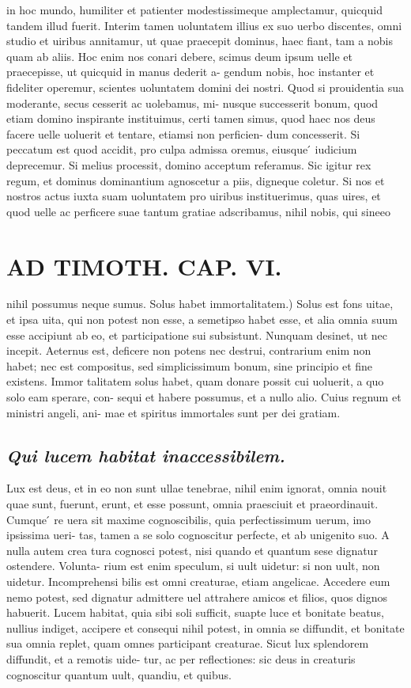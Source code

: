 \documentclass{article}
\begin{document}
\begin{pages}
in hoc mundo, humiliter et patienter modestissimeque amplectamur, quicquid tandem illud fuerit. Interim tamen uoluntatem illius ex suo uerbo discentes, omni studio et uiribus annitamur, ut quae praecepit dominus, haec fiant, tam a nobis quam ab aliis. Hoc enim nos conari debere, scimus deum ipsum uelle et praecepisse, ut quicquid in manus dederit a- gendum nobis, hoc instanter et fideliter operemur, scientes uoluntatem domini dei nostri. Quod si prouidentia sua moderante, secus cesserit ac uolebamus, mi- nusque successerit bonum, quod etiam domino inspirante instituimus, certi tamen simus, quod haec nos deus facere uelle uoluerit et tentare, etiamsi non perficien- dum concesserit. Si peccatum est quod accidit, pro culpa admissa oremus, eiusque ́ iudicium deprecemur. Si melius processit, domino acceptum referamus. Sic igitur rex regum, et dominus dominantium agnoscetur a piis, digneque coletur. Si nos et nostros actus iuxta suam uoluntatem pro uiribus instituerimus, quas uires, et quod uelle ac perficere suae tantum gratiae adscribamus, nihil nobis, qui sineeo  \pend
\section*{AD TIMOTH. CAP. VI. }
\marginpar{[ p.539 ]}\pstart nihil possumus neque sumus. Solus habet immortalitatem.) Solus est fons uitae, et ipsa uita, qui non potest non esse, a semetipso habet esse, et alia omnia suum esse accipiunt ab eo, et participatione sui subsistunt. Nunquam desinet, ut nec incepit. Aeternus est, deficere non potens nec destrui, contrarium enim non habet; nec est compositus, sed simplicissimum bonum, sine principio et fine existens. Immor talitatem solus habet, quam donare possit cui uoluerit, a quo solo eam sperare, con- sequi et habere possumus, et a nullo alio. Cuius regnum et ministri angeli, ani- mae et spiritus immortales sunt per dei gratiam.  \pend
{}
{}
\subsection*{\textit{Qui lucem habitat inaccessibilem. }}\pstart Lux est deus, et in eo non sunt ullae tenebrae, nihil enim ignorat, omnia nouit quae sunt, fuerunt, erunt, et esse possunt, omnia praesciuit et praeordinauit. Cumque ́ re uera sit maxime cognoscibilis, quia perfectissimum uerum, imo ipsissima ueri- tas, tamen a se solo cognoscitur perfecte, et ab unigenito suo. A nulla autem crea tura cognosci potest, nisi quando et quantum sese dignatur ostendere. Volunta- rium est enim speculum, si uult uidetur: si non uult, non uidetur. Incomprehensi bilis est omni creaturae, etiam angelicae. Accedere eum nemo potest, sed dignatur admittere uel attrahere amicos et filios, quos dignos habuerit. Lucem habitat, quia sibi soli sufficit, suapte luce et bonitate beatus, nullius indiget, accipere et consequi nihil potest, in omnia se diffundit, et bonitate sua omnia replet, quam omnes participant creaturae. Sicut lux splendorem diffundit, et a remotis uide- tur, ac per reflectiones: sic deus in creaturis cognoscitur quantum uult, quandiu, et quibus.  \pend
{}
{}

\end{pages}
\end{document}
